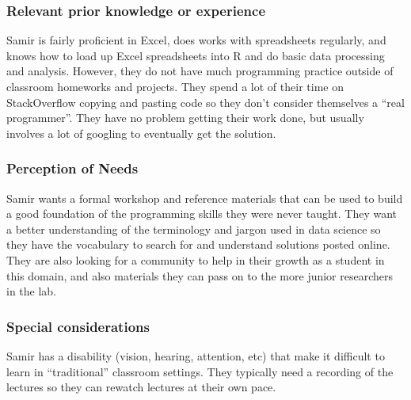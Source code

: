 \documentclass[020-persona\_validation.tex]{subfiles}
\begin{document}
        \subsubsection{Relevant prior knowledge or experience}

            Samir is fairly proficient in Excel,
            does works with spreadsheets regularly, and
            knows how to load up Excel spreadsheets into R and do basic data processing and analysis.
            However,
            they do not have much programming practice outside of classroom homeworks and projects.
            They spend a lot of their time on StackOverflow copying and pasting code
            so they don't consider themselves a ``real programmer''.
            They have no problem getting their work done,
            but usually involves a lot of googling to eventually get the solution.

        \subsubsection{Perception of Needs}

            Samir wants a formal workshop and reference materials
            that can be used to build a good foundation of the programming skills they were never taught.
            They want a better understanding of the terminology and jargon used in data science
            so they have the vocabulary to search for and understand solutions posted online.
            They are also looking for a community to help in their growth as a student in this domain,
            and also materials they can pass on to the more junior researchers in the lab.

        \subsubsection{Special considerations}

            Samir has a disability (vision, hearing, attention, etc)
            that make it difficult to learn in ``traditional'' classroom settings.
            They typically need a recording of the lectures so they can rewatch lectures at their own pace.
\end{document}

